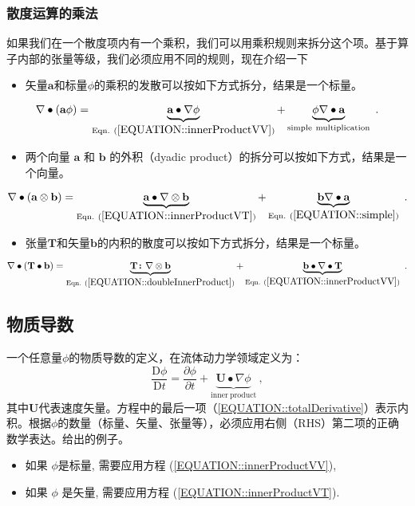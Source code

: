 \documentclass[MathematicsNumericsDerivationsAndOpenFOAM.tex]{subfiles}
\begin{document}
\subsubsection{散度运算的乘法}
%
%
	如果我们在一个散度项内有一个乘积，我们可以用乘积规则来拆分这个项。基于算子内部的$\texttt{张量}$等级，我们必须应用不同的规则，现在介绍一下
%
%
\begin{itemize}
    \item 矢量$\textbf{a}$和标量$\phi$的乘积的发散可以按如下方式拆分，结果是一个标量。
\end{itemize}
%
%
\begin{equation}
 \nabla \bullet (\textbf{a} \phi)  =  \underbrace{\textbf{a} \bullet \nabla \phi}_{\mathrm{Eqn.~} (\ref{EQUATION::innerProductVV})} + \underbrace{\phi \nabla \bullet \textbf{a}}_{\mathrm{simple~multiplication}}~.
 \label{EQUATION::productRuleVS}
\end{equation}
%
%
\begin{itemize}
    \item 两个向量 $\textbf{a}$ 和 $\textbf{b}$ 的外积（dyadic product）的拆分可以按如下方式，结果是一个向量。
\end{itemize}
%
%
\begin{equation}
 \nabla \bullet (\textbf{a} \otimes \textbf{b})  =  \underbrace{\textbf{a} \bullet \nabla \otimes \textbf{b}}_{\mathrm{Eqn.~}(\ref{EQUATION::innerProductVT})} + \underbrace{\textbf{b} \nabla \bullet \textbf{a}}_{\mathrm{Eqn.~}(\ref{EQUATION::simple})} ~.
 \label{EQUATION::productRuleVV}
\end{equation}
%
%
\begin{itemize}
    \item 张量$\textbf{T}$和矢量$\textbf{b}$的内积的散度可以按如下方式拆分，结果是一个标量。
\end{itemize}
%
%
\begin{equation}
 \nabla \bullet (\textbf{T} \bullet \textbf{b})  =  \underbrace{\textbf{T} \boldsymbol \colon \nabla \otimes \textbf{b}}_{\mathrm{Eqn.~} (\ref{EQUATION::doubleInnerProduct})} + \underbrace{\textbf{b} \bullet \nabla \bullet \textbf{T}}_{\mathrm{Eqn.~}(\ref{EQUATION::innerProductVV})} ~.
 \label{EQUATION::productRuleTV}
\end{equation}
%
%
%
%
\subsection{物质导数}
%
%
      一个任意量$\phi$的物质导数的定义，在流体动力学领域定义为：
%
%
\begin{equation}
    \frac{\mathrm{D}\phi}{\mathrm{D}t} = \frac{\partial \phi}{\partial t} + \underbrace{\textbf{U}\bullet \nabla \phi}_{\mathrm{inner~product}} ~,
    \label{EQUATION::totalDerivative}
\end{equation}
%
%
	其中$\textbf{U}$代表速度矢量。方程中的最后一项（\ref{EQUATION::totalDerivative}）表示内积。根据$\phi$的数量（标量、矢量、张量等），必须应用右侧（RHS）第二项的正确数学表达。给出的例子。
%
%
\begin{itemize}
    \item 如果 $\phi$是标量, 需要应用方程 (\ref{EQUATION::innerProductVV}),
    \item 如果 $\phi$ 是矢量, 需要应用方程 (\ref{EQUATION::innerProductVT}).
\end{itemize}
%
%
%
%
\end{document}
